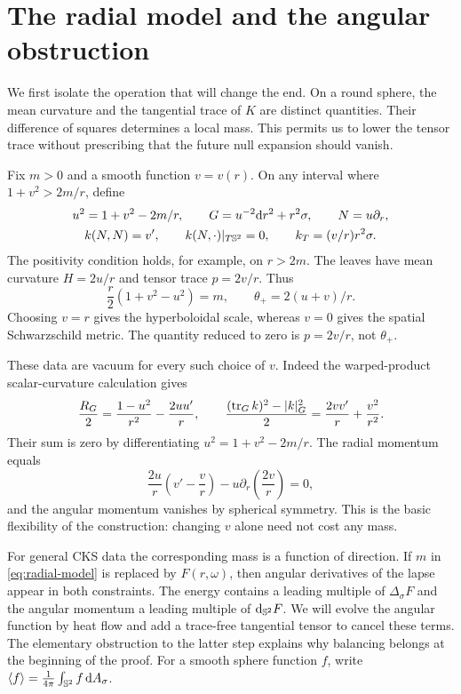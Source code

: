 \section{The radial model and the angular obstruction}\label{sec:model}

We first isolate the operation that will change the end. On a round
sphere, the mean curvature and the tangential trace of $K$ are distinct
quantities. Their difference of squares determines a local mass. This
permits us to lower the tensor trace without prescribing that the future
null expansion should vanish.

Fix $m>0$ and a smooth function $v=v(r)$. On any interval where
$1+v^2>2m/r$, define
\begin{equation}\label{eq:radial-model}
 \begin{gathered}
 u^2=1+v^2-2m/r,\qquad
 G=u^{-2}\mathrm dr^2+r^2\sigma,\qquad N=u\partial_r,\\
 k(N,N)=v',\qquad k(N,\cdot)|_{T\mathbb S^2}=0,\qquad
 k_T=(v/r)r^2\sigma.
 \end{gathered}
\end{equation}
The positivity condition holds, for example, on $r>2m$.
The leaves have mean curvature $H=2u/r$ and tensor trace $p=2v/r$.
Thus
\[
 \frac r2(1+v^2-u^2)=m,\qquad \theta_+=2(u+v)/r.
\]
Choosing $v=r$ gives the hyperboloidal scale, whereas $v=0$ gives
the spatial Schwarzschild metric. The quantity reduced to zero is
$p=2v/r$, not $\theta_+$.

These data are vacuum for every such choice of $v$. Indeed the
warped-product scalar-curvature calculation gives
\[
 \frac{R_G}{2}=\frac{1-u^2}{r^2}-\frac{2uu'}r,
 \qquad
 \frac{(\operatorname{tr}_Gk)^2-|k|_G^2}{2}
       =\frac{2vv'}r+\frac{v^2}{r^2}.
\]
Their sum is zero by differentiating $u^2=1+v^2-2m/r$.
The radial momentum equals
\[
 \frac{2u}r\left(v'-\frac vr\right)
           -u\partial_r\left(\frac{2v}r\right)=0,
\]
and the angular momentum vanishes by spherical symmetry. This is the
basic flexibility of the construction: changing $v$ alone need not cost
any mass.

For general CKS data the corresponding mass is a function of direction.
If $m$ in \eqref{eq:radial-model} is replaced by $F(r,\omega)$, then
angular derivatives of the lapse appear in both constraints. The energy
contains a leading multiple of $\Delta_\sigma F$ and the angular
momentum a leading multiple of $\mathrm d_{\mathbb S^2}F$. We will evolve
the angular function by heat flow and add a trace-free tangential tensor
to cancel these terms. The elementary obstruction to the latter step
explains why balancing belongs at the beginning of the proof.
For a smooth sphere function $f$, write
$\langle f\rangle=\frac{1}{4\pi}\int_{\mathbb S^2}f\,\mathrm dA_\sigma$.

